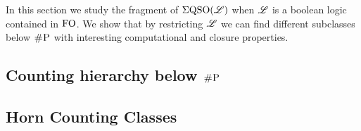 
In this section we study the fragment of $\Sigma{\rm QSO}(\mathscr{L})$ when $\mathscr{L}$ is a boolean logic contained in ${\rm FO}$. We show that by restricting $\mathscr{L}$ we can find different subclasses below $\text{\sc \#P}$ with interesting computational and closure properties. 

\subsection{Counting hierarchy below $\text{\sc \#P}$}


\subsection{Horn Counting Classes}

